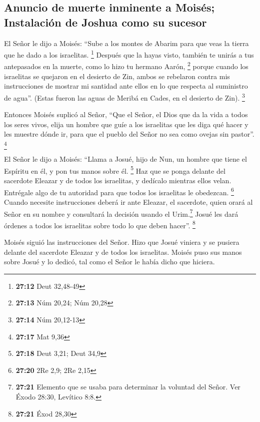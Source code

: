 \hypertarget{anuncio-de-muerte-inminente-a-moisuxe9s-instalaciuxf3n-de-joshua-como-su-sucesor}{%
\subsection{Anuncio de muerte inminente a Moisés; Instalación de Joshua
como su
sucesor}\label{anuncio-de-muerte-inminente-a-moisuxe9s-instalaciuxf3n-de-joshua-como-su-sucesor}}

 El Señor le dijo a Moisés: ``Sube a los montes de Abarim
para que veas la tierra que he dado a los israelitas. \footnote{\textbf{27:12}
  Deut 32,48-49}  Después que la hayas visto, también te
unirás a tus antepasados en la muerte, como lo hizo tu hermano Aarón,
\footnote{\textbf{27:13} Núm 20,24; Núm 20,28}  porque
cuando los israelitas se quejaron en el desierto de Zin, ambos se
rebelaron contra mis instrucciones de mostrar mi santidad ante ellos en
lo que respecta al suministro de agua''. (Estas fueron las aguas de
Meribá en Cades, en el desierto de Zin). \footnote{\textbf{27:14} Núm
  20,12-13}

 Entonces Moisés suplicó al Señor,  ``Que
el Señor, el Dios que da la vida a todos los seres vivos, elija un
hombre que guíe a los israelitas  que les diga qué hacer
y les muestre dónde ir, para que el pueblo del Señor no sea como ovejas
sin pastor''. \footnote{\textbf{27:17} Mat 9,36}

 El Señor le dijo a Moisés: ``Llama a Josué, hijo de Nun,
un hombre que tiene el Espíritu en él, y pon tus manos sobre él.
\footnote{\textbf{27:18} Deut 3,21; Deut 34,9}  Haz que
se ponga delante del sacerdote Eleazar y de todos los israelitas, y
dedícalo mientras ellos velan.  Entrégale algo de tu
autoridad para que todos los israelitas le obedezcan. \footnote{\textbf{27:20}
  2Re 2,9; 2Re 2,15}  Cuando necesite instrucciones
deberá ir ante Eleazar, el sacerdote, quien orará al Señor en su nombre
y consultará la decisión usando el Urim.\footnote{\textbf{27:21}
  Elemento que se usaba para determinar la voluntad del Señor. Ver Éxodo
  28:30, Levítico 8:8.} Josué les dará órdenes a todos los israelitas
sobre todo lo que deben hacer''. \footnote{\textbf{27:21} Éxod 28,30}

 Moisés siguió las instrucciones del Señor. Hizo que
Josué viniera y se pusiera delante del sacerdote Eleazar y de todos los
israelitas.  Moisés puso sus manos sobre Josué y lo
dedicó, tal como el Señor le había dicho que hiciera.

